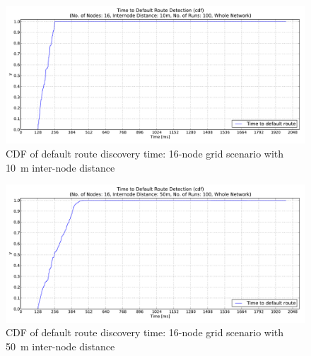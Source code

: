 \begin{figure}[htpb]
  \begin{center}
   \vspace{-20pt}
    \leavevmode
      \includegraphics[scale=0.38]
      {Pics/results/16/MRHOF/grid/dist10_montecarlo_cdf_hist.pdf}
   \caption{CDF of default route discovery time: 16-node grid scenario with 10~m inter-node distance}
   \label{fig:16_MRHOF_grid_10_cdf}
  \end{center}
\end{figure}

\begin{figure}[htpb]
  \begin{center}
   \vspace{-20pt}
    \leavevmode
      \includegraphics[scale=0.38]
      {Pics/results/16/MRHOF/grid/dist50_montecarlo_cdf_hist.pdf}
   \caption{CDF of default route discovery time: 16-node grid scenario with 50~m inter-node distance}
   \label{fig:16_MRHOF_grid_50_cdf}
  \end{center}
\end{figure}

